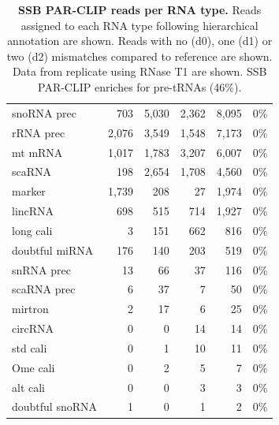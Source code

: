 \documentclass[12pt]{rockefeller}
\begin{document}
\begin{table}[!ht]
\begin{adjustbox}{max width = \textwidth}
\begin{tabular}{|l|r|r|r|r|r|}
     snoRNA prec &        703 &       5,030 &       2,362 &       8,095 &               0\% \\
       rRNA prec &      2,076 &       3,549 &       1,548 &       7,173 &               0\% \\
         mt mRNA &      1,017 &       1,783 &       3,207 &       6,007 &               0\% \\
          scaRNA &        198 &       2,654 &       1,708 &       4,560 &               0\% \\
          marker &      1,739 &         208 &          27 &       1,974 &               0\% \\
         lincRNA &        698 &         515 &         714 &       1,927 &               0\% \\
       long cali &          3 &         151 &         662 &         816 &               0\% \\
  doubtful miRNA &        176 &         140 &         203 &         519 &               0\% \\
      snRNA prec &         13 &          66 &          37 &         116 &               0\% \\
     scaRNA prec &          6 &          37 &           7 &          50 &               0\% \\
         mirtron &          2 &          17 &           6 &          25 &               0\% \\
         circRNA &          0 &           0 &          14 &          14 &               0\% \\
        std cali &          0 &           1 &          10 &          11 &               0\% \\
        Ome cali &          0 &           2 &           5 &           7 &               0\% \\
        alt cali &          0 &           0 &           3 &           3 &               0\% \\
 doubtful snoRNA &          1 &           0 &           1 &           2 &               0\% \\
\hline
  \end{tabular}
  \end{adjustbox}
\caption[SSB PAR-CLIP reads per RNA type]{\textbf{SSB PAR-CLIP reads per RNA type.} Reads assigned to each RNA type following hierarchical annotation are shown. Reads with no (d0), one (d1) or two (d2) mismatches compared to reference are shown. Data from replicate using RNase T1 are shown. SSB PAR-CLIP enriches for pre-tRNAs (46\%).}\label{tableS3}
\end{table}
\end{document}
